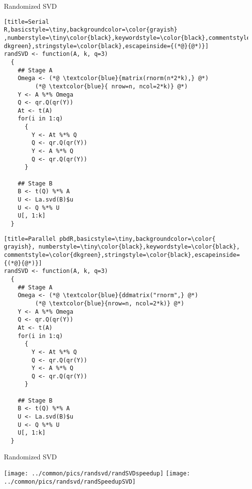 \begin{frame}[fragile]
 \fontsize{8pt}{10}\selectfont
\begin{block}{Randomized SVD}
  \hfill
  \begin{minipage}{0.430\textwidth}
\begin{lstlisting}[title=Serial 
R,basicstyle=\tiny,backgroundcolor=\color{grayish} 
,numberstyle=\tiny\color{black},keywordstyle=\color{black},commentstyle=\color{ 
dkgreen},stringstyle=\color{black},escapeinside={(*@}{@*)}]
randSVD <- function(A, k, q=3)
  {
    ## Stage A
    Omega <- (*@ \textcolor{blue}{matrix(rnorm(n*2*k),} @*) 
         (*@ \textcolor{blue}{ nrow=n, ncol=2*k)} @*)
    Y <- A %*% Omega
    Q <- qr.Q(qr(Y))
    At <- t(A)
    for(i in 1:q)
      {
        Y <- At %*% Q
        Q <- qr.Q(qr(Y))
        Y <- A %*% Q
        Q <- qr.Q(qr(Y))
      }
    
    ## Stage B
    B <- t(Q) %*% A
    U <- La.svd(B)$u
    U <- Q %*% U
    U[, 1:k]
  }
\end{lstlisting} %
  \end{minipage}
  \hfill
  \begin{minipage}{0.430\textwidth}
\begin{lstlisting}[title=Parallel pbdR,basicstyle=\tiny,backgroundcolor=\color{
grayish}, numberstyle=\tiny\color{black},keywordstyle=\color{black},
commentstyle=\color{dkgreen},stringstyle=\color{black},escapeinside={(*@}{@*)}]
randSVD <- function(A, k, q=3)
  {
    ## Stage A
    Omega <- (*@ \textcolor{blue}{ddmatrix("rnorm",} @*)
         (*@ \textcolor{blue}{nrow=n, ncol=2*k)} @*)
    Y <- A %*% Omega
    Q <- qr.Q(qr(Y))
    At <- t(A)      
    for(i in 1:q)
      {
        Y <- At %*% Q   
        Q <- qr.Q(qr(Y))
        Y <- A %*% Q    
        Q <- qr.Q(qr(Y))
      }
    
    ## Stage B
    B <- t(Q) %*% A     
    U <- La.svd(B)$u 
    U <- Q %*% U     
    U[, 1:k]
  }
\end{lstlisting}  %
  \end{minipage}
\hfill
\end{block}
\end{frame}

\begin{frame}
  \begin{block}{Randomized SVD}
    \begin{center}
      \texttt{[image: ../common/pics/randsvd/randSVDspeedup]}
      \hfill
      \texttt{[image: ../common/pics/randsvd/randSpeedupSVD]}
    \end{center}
  \end{block}
\end{frame}